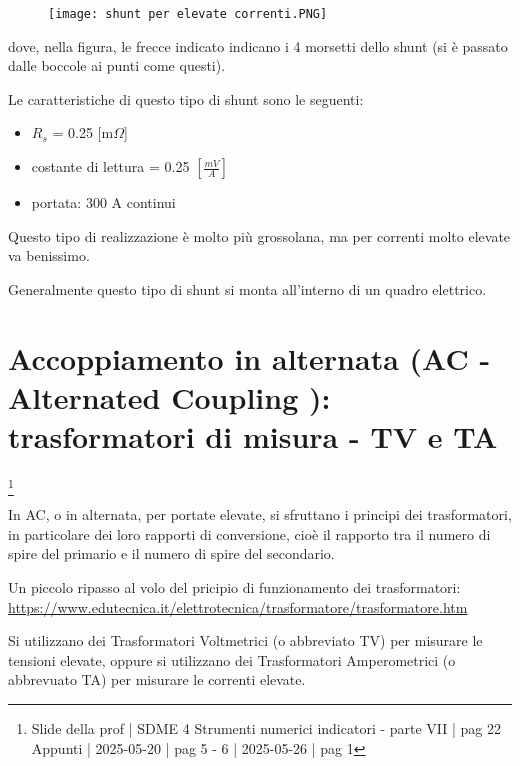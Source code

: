 \begin{figure}[h]
    \centering
    \texttt{[image: shunt per elevate correnti.PNG]}
\end{figure}

dove, nella figura, le frecce indicato indicano i 4 morsetti dello shunt (si è passato dalle boccole ai punti come questi). \newline 

Le caratteristiche di questo tipo di shunt sono le seguenti: 

\begin{itemize}
    \item $R_s$ = 0.25 [m$\Omega$]
    \item costante di lettura = 0.25 $[\frac{mV}{A}]$
    \item portata: 300 A continui
\end{itemize}

Questo tipo di realizzazione è molto più grossolana, ma per correnti molto elevate va benissimo. \newline 

Generalmente questo tipo di shunt si monta all'interno di un quadro elettrico. \newline 

\newpage 

\section{Accoppiamento in alternata (AC - Alternated Coupling ): trasformatori di misura - TV e TA}
\footnote{Slide della prof | SDME 4 Strumenti numerici indicatori - parte VII | pag 22\\  
Appunti | 2025-05-20 | pag 5 - 6 | 2025-05-26 | pag 1}

In AC, o in alternata, per portate elevate, si sfruttano i principi dei trasformatori, in particolare dei loro rapporti di conversione, 
cioè il rapporto tra il numero di spire del primario e il numero di spire del secondario. \newline 

\begin{tcolorbox}
    Un piccolo ripasso al volo del pricipio di funzionamento dei trasformatori: \\
    \url{https://www.edutecnica.it/elettrotecnica/trasformatore/trasformatore.htm}
\end{tcolorbox}

Si utilizzano dei Trasformatori Voltmetrici (o abbreviato TV) per misurare le tensioni elevate, 
oppure si utilizzano dei Trasformatori Amperometrici (o abbrevuato TA) per misurare le correnti elevate. \newline 

